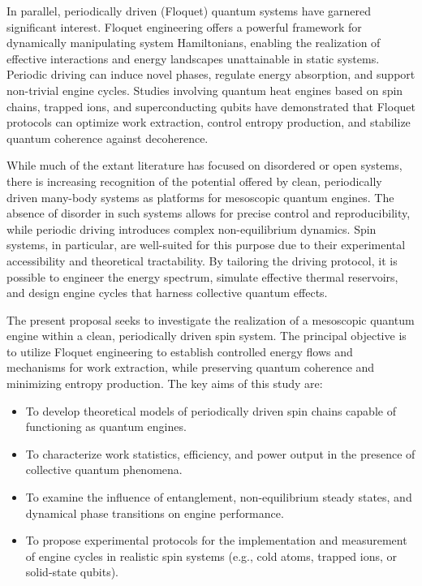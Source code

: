 \documentclass[%
reprint,
superscriptaddress,
amsmath,amssymb,
aps,
prb,
showkeys,
]{revtex4-2}
\begin{document}
In parallel, periodically driven (Floquet) quantum systems have garnered significant interest. Floquet engineering offers a powerful framework for dynamically manipulating system Hamiltonians, enabling the realization of effective interactions and energy landscapes unattainable in static systems. Periodic driving can induce novel phases, regulate energy absorption, and support non-trivial engine cycles. Studies involving quantum heat engines based on spin chains, trapped ions, and superconducting qubits have demonstrated that Floquet protocols can optimize work extraction, control entropy production, and stabilize quantum coherence against decoherence.

While much of the extant literature has focused on disordered or open systems, there is increasing recognition of the potential offered by clean, periodically driven many-body systems as platforms for mesoscopic quantum engines. The absence of disorder in such systems allows for precise control and reproducibility, while periodic driving introduces complex non-equilibrium dynamics. Spin systems, in particular, are well-suited for this purpose due to their experimental accessibility and theoretical tractability. By tailoring the driving protocol, it is possible to engineer the energy spectrum, simulate effective thermal reservoirs, and design engine cycles that harness collective quantum effects.

The present proposal seeks to investigate the realization of a mesoscopic quantum engine within a clean, periodically driven spin system. The principal objective is to utilize Floquet engineering to establish controlled energy flows and mechanisms for work extraction, while preserving quantum coherence and minimizing entropy production. The key aims of this study are:

\begin{itemize}
\item To develop theoretical models of periodically driven spin chains capable of functioning as quantum engines.
\item To characterize work statistics, efficiency, and power output in the presence of collective quantum phenomena.
\item To examine the influence of entanglement, non-equilibrium steady states, and dynamical phase transitions on engine performance.
\item To propose experimental protocols for the implementation and measurement of engine cycles in realistic spin systems (e.g., cold atoms, trapped ions, or solid-state qubits).
\end{itemize}
\end{document}
